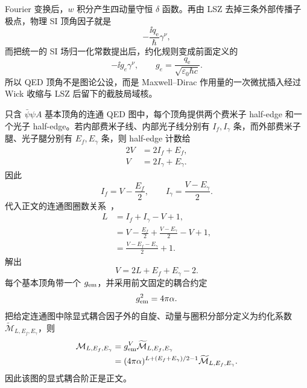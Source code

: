 \begin{derivation}
Fourier 变换后，$w$ 积分产生四动量守恒 \(\delta\) 函数。再由 LSZ 去掉三条外部传播子极点，物理 SI 顶角因子就是
\begin{equation*}
 -\frac{\ii q_{\mathrm e}}{\hbar}\gamma^\nu,
 \end{equation*}
而把统一的 SI 场归一化常数提出后，约化规则变成前面定义的
\begin{equation*}
 {-\ii g_e\gamma^\nu,\qquad
 g_e=\frac{q_{\mathrm e}}{\sqrt{\varepsilon_0\hbar c}}.}
 \end{equation*}
所以 QED 顶角不是图论公设，而是 Maxwell--Dirac 作用量的一次微扰插入经过 Wick 收缩与 LSZ 后留下的截肢局域核。
\end{derivation}



\begin{derivation}

只含 $\bar\psi\psi A$ 基本顶角的连通 QED 图中，每个顶角提供两个费米子 half-edge 和一个光子 half-edge。若内部费米子线、内部光子线分别有 $I_f,I_\gamma$ 条，而外部费米子腿、光子腿分别有 $E_f,E_\gamma$ 条，则 half-edge 计数给
\begin{align*}
2V&=2I_f+E_f,\\
V&=2I_\gamma+E_\gamma.
\end{align*}
因此
\begin{equation*}
I_f=V-\frac{E_f}{2},
\qquad
I_\gamma=\frac{V-E_\gamma}{2}.
\end{equation*}
代入正文的连通图圈数关系~，
\begin{align*}
L
&=I_f+I_\gamma-V+1,\\
&=V-\frac{E_f}{2}+\frac{V-E_\gamma}{2}-V+1,\\
&=\frac{V-E_f-E_\gamma}{2}+1.
\end{align*}
解出
\begin{equation*}
V=2L+E_f+E_\gamma-2.
\end{equation*}
每个基本顶角带一个 $g_{\rm em}$，并采用前文固定的耦合约定
\begin{equation*}
 g_{\rm em}^2=4\pi\alpha.
\end{equation*}
把给定连通图中除显式耦合因子外的自旋、动量与圈积分部分定义为约化系数 $\widetilde{\mathcal M}_{L,E_f,E_\gamma}$，则
\begin{align*}
 \mathcal M_{L,E_f,E_\gamma}
 &=g_{\rm em}^{V}\widetilde{\mathcal M}_{L,E_f,E_\gamma}\\
 &=(4\pi\alpha)^{L+(E_f+E_\gamma)/2-1}
 \widetilde{\mathcal M}_{L,E_f,E_\gamma}.
\end{align*}
因此该图的显式耦合阶正是正文。
\end{derivation}
